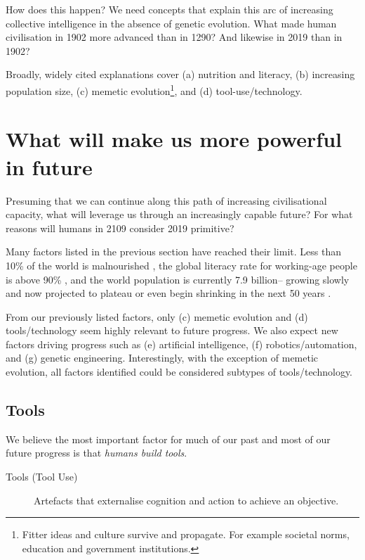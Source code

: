 \documentclass[logo,bsc,singlespacing,parskip]{infthesis}
\begin{document}
How does this happen?
We need concepts that explain this arc of increasing collective intelligence in the absence of genetic evolution.
What made human civilisation in 1902 more advanced than in 1290?
And likewise in 2019 than in 1902?

Broadly, widely cited explanations cover (a) nutrition and literacy, (b) increasing population size, (c) memetic evolution\footnote{Fitter ideas and culture survive and propagate. For example societal norms, education and government institutions.}, and (d) tool-use/technology.

\section{What will make us more powerful in future}
\label{sec:org63310d1}
Presuming that we can continue along this path of increasing civilisational capacity, what will leverage us through an increasingly capable future?
For what reasons will humans in 2109 consider 2019 primitive?

Many factors listed in the previous section have reached their limit.
Less than 10\% of the world is malnourished \autocite{OurWorldData}, the global literacy rate for working-age people is above 90\% \autocite{OurWorldData}, and the world population is currently 7.9 billion-- growing slowly and now projected to plateau or even begin shrinking in the next 50 years \autocite{OurWorldData}.

From our previously listed factors, only (c) memetic evolution and (d) tools/technology seem highly relevant to future progress.
We also expect new factors driving progress such as (e) artificial intelligence, (f) robotics/automation, and (g) genetic engineering.
Interestingly, with the exception of memetic evolution, all factors identified could be considered subtypes of tools/technology.

\subsection{Tools}
\label{sec:org636ef9c}
We believe the most important factor for much of our past and most of our future progress is that \emph{humans build tools}.

\begin{mdframed}
\begin{description}
\item[{Tools (Tool Use)}] Artefacts that externalise cognition and action to achieve an objective.
\end{description}
\end{mdframed}
\end{document}
